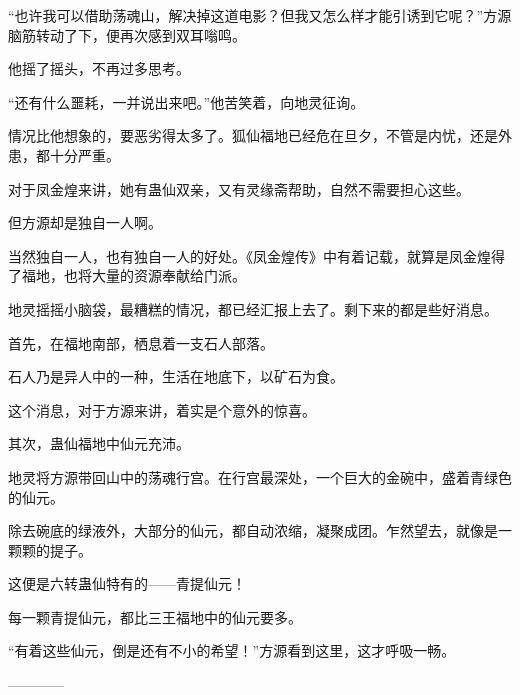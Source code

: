 \begin{this_body}
“也许我可以借助荡魂山，解决掉这道电影？但我又怎么样才能引诱到它呢？”方源脑筋转动了下，便再次感到双耳嗡鸣。

他摇了摇头，不再过多思考。

“还有什么噩耗，一并说出来吧。”他苦笑着，向地灵征询。

情况比他想象的，要恶劣得太多了。狐仙福地已经危在旦夕，不管是内忧，还是外患，都十分严重。

对于凤金煌来讲，她有蛊仙双亲，又有灵缘斋帮助，自然不需要担心这些。

但方源却是独自一人啊。

当然独自一人，也有独自一人的好处。《凤金煌传》中有着记载，就算是凤金煌得了福地，也将大量的资源奉献给门派。

地灵摇摇小脑袋，最糟糕的情况，都已经汇报上去了。剩下来的都是些好消息。

首先，在福地南部，栖息着一支石人部落。

石人乃是异人中的一种，生活在地底下，以矿石为食。

这个消息，对于方源来讲，着实是个意外的惊喜。

其次，蛊仙福地中仙元充沛。

地灵将方源带回山中的荡魂行宫。在行宫最深处，一个巨大的金碗中，盛着青绿色的仙元。

除去碗底的绿液外，大部分的仙元，都自动浓缩，凝聚成团。乍然望去，就像是一颗颗的提子。

这便是六转蛊仙特有的——青提仙元！

每一颗青提仙元，都比三王福地中的仙元要多。

“有着这些仙元，倒是还有不小的希望！”方源看到这里，这才呼吸一畅。

------------

\end{this_body}

